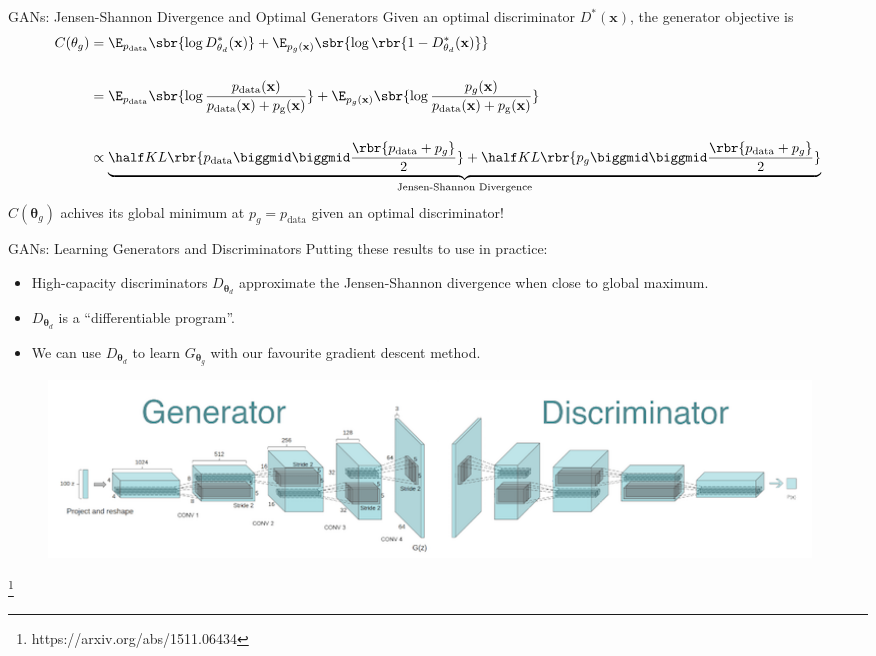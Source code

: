 \documentclass[notheorems]{beamer}
\newcommand{\source}[1]{{\let\thefootnote\relax\footnote{{\tiny #1}}}}
\newcommand{\xx}{\mathbf{x}}
\newcommand{\vtheta}{\mathbf{\theta}}
\begin{document}
    \begin{frame}{GANs: Jensen-Shannon Divergence and Optimal Generators}
        Given an optimal discriminator $D^*(\xx)$, the generator objective is
        \begin{align*}
            C(\vtheta_g) &= \E_{p_{\text{data}}} \sbr{\log D^*_{\vtheta_d}(\xx)} + \E_{p_g(\xx)} \sbr{\log \rbr{1 - D^*_{\vtheta_d}(\xx)}}\\ \\
            &= \E_{p_{\text{data}}} \sbr{\log \frac{p_{\text{data}}(\xx)}{p_{\text{data}}(\xx) + p_{\text{g}}(\xx)}} + \E_{p_{g}(\xx)} \sbr{\log \frac{p_{g}(\xx)}{p_{\text{data}}(\xx) + p_{\text{g}}(\xx)}}\\ \\
            &\propto \underbrace{\half KL\rbr{p_{\text{data}} \biggmid \biggmid \frac{\rbr{p_{\text{data}} + p_g}}{2}} + \half KL\rbr{p_{g} \biggmid \biggmid \frac{\rbr{p_{\text{data}} + p_g}}{2}}}_{\text{Jensen-Shannon Divergence}}
        \end{align*}
        $C(\vtheta_g)$ achives its global minimum at $p_g = p_{\text{data}}$ given an optimal discriminator!
    \end{frame}

    \begin{frame}{GANs: Learning Generators and Discriminators}
        Putting these results to use in practice:
        \begin{itemize}
            \item High-capacity discriminators $D_{\vtheta_d}$ approximate the Jensen-Shannon divergence when close to global maximum.
            \item $D_{\vtheta_d}$ is a ``differentiable program''.
            \item We can use $D_{\vtheta_d}$ to learn $G_{\vtheta_g}$ with our favourite gradient descent method.
        \end{itemize}

        \begin{figure}
            \centering
            \includegraphics[width=0.98\textwidth]{figures/conv_gan}
        \end{figure}

        \source{https://arxiv.org/abs/1511.06434}

    \end{frame}
\end{document}
